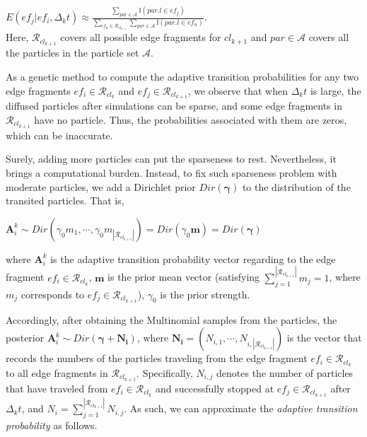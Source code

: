 \documentclass{vldb}
\begin{document}
	$E(ef_{j}|ef_i,\Delta_k t)\approx \frac{ \sum_{par\in\mathcal{A}}\mathbb{I}(par.l\in ef_{j})}{\sum_{ef_n\in \mathcal{R}_{cl_{k+1}}}\sum_{par\in\mathcal{A}}\mathbb{I}(par.l\in ef_n)}$.
	\\
	
	Here, $\mathcal{R}_{cl_{k+1}}$ covers all possible edge fragments for $cl_{k+1}$ and $par\in\mathcal{A}$ covers all the particles in the particle set $\mathcal{A}$. %
	
	
	As a genetic method to compute the adaptive transition probabilities for any two edge fragments $ef_i\in \mathcal{R}_{cl_{k}}$ and $ef_j\in \mathcal{R}_{cl_{k+1}}$, we observe that when $\Delta_k t$ is large, the diffused particles after simulations can be sparse, and some edge fragments in $\mathcal{R}_{cl_{k+1}}$ have no particle. 
	Thus, the probabilities associated with them are zeros, which can be inaccurate. %
	
	
	Surely, adding more particles can put the sparseness to rest.
	Nevertheless, it brings a computational burden.
	Instead, to fix such sparseness problem with moderate particles, we add a Dirichlet prior $Dir(\bm{\gamma})$ to the distribution of the transited particles. That is,
	
	\noindent$\mathbf{A}_i^k\sim Dir(\gamma_0m_1, \cdots, \gamma_0m_{|\mathcal{R}_{cl_{k+1}}|})=Dir(\gamma_0\mathbf{m})=Dir(\bm{\gamma})$
	
	
	\noindent where $\mathbf{A}_i^k$ is the adaptive transition probability vector 
	regarding to the edge fragment $ef_i\in \mathcal{R}_{cl_k}$,
	$\mathbf{m}$ is the prior mean vector (satisfying $\sum_{j=1}^{|\mathcal{R}_{cl_{k+1}}|} m_j=1$, where $m_j$ corresponds to $ef_j\in \mathcal{R}_{cl_{k+1}}$), 
	$\gamma_0$ is the prior strength. %
	
	Accordingly, after obtaining the Multinomial samples from the particles, the posterior $\mathbf{A}_i^k\sim Dir(\bm{\gamma}+\bm{N_{i}})$, where $\bm{N_i}=(N_{i,1}, \cdots, N_{i,|\mathcal{R}_{cl_{k+1}}|})$ is the vector that records the numbers of the particles traveling from the edge fragment $ef_i\in \mathcal{R}_{cl_k}$ to all edge fragments in $\mathcal{R}_{cl_{k+1}}$.
	Specifically, $N_{i,j}$ denotes the number of particles that have traveled from $ef_i\in \mathcal{R}_{cl_k}$ and successfully stopped at $ef_j\in \mathcal{R}_{cl_{k+1}}$ after $\Delta_k t$, and $N_i=\sum_{j=1}^{|\mathcal{R}_{cl_{k+1}}|} N_{i,j}$.
	As such, we can approximate the {\em adaptive transition probability} as follows.
	
\end{document}
